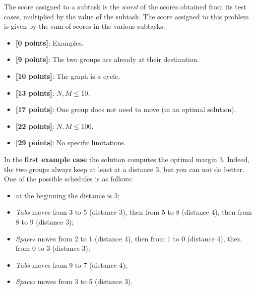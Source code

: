 The score assigned to a subtask is the \emph{worst} of the scores obtained from its test cases, multiplied by the value of the subtask.
The score assigned to this problem is given by the sum of scores in the various subtasks.

\begin{itemize}[nolistsep,itemsep=2mm]
  \item \textbf{ [\phantom{1}0 points]}: Examples.
  \item \textbf{ [\phantom{1}9 points]}: The two groups are already at their destination.
  \item \textbf{ [10 points]}: The graph is a cycle.
  \item \textbf{ [13 points]}: $N, M \leq 10$.
  \item \textbf{ [17 points]}: One group does not need to move (in an optimal solution).
  \item \textbf{ [22 points]}: $N, M \leq 100$.
  \item \textbf{ [29 points]}: No specific limitations.
\end{itemize}



\Examples

\begin{example}
%
%
\end{example}



\Explanation

In the  \textbf{first example case} the solution computes the optimal margin $3$.
Indeed, the two groups always keep at least at a distance $3$,
but you can not do better.
One of the possible schedules is as follows:

\begin{itemize}
 \item at the beginning the distance is 3;
 \item \emph{Tabs} moves from 3 to 5 (distance 3), then from 5 to 8 (distance 4), then from 8 to 9 (distance 3);
 \item \emph{Spaces} moves from 2 to 1 (distance 4), then from 1 to 0 (distance 4), then from 0 to 3 (distance 3);
 \item \emph{Tabs} moves from 9 to 7 (distance 4);
 \item \emph{Spaces} moves from 3 to 5 (distance 3).
\end{itemize}

